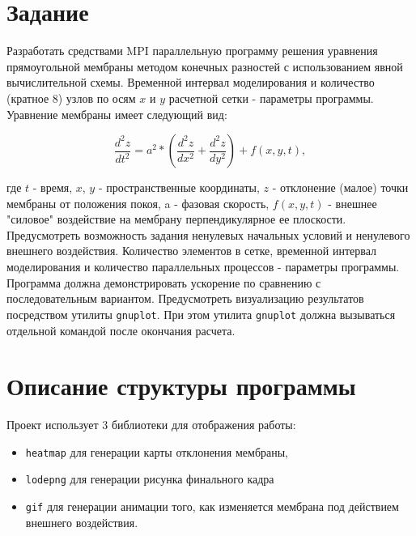 \section*{Задание}

Разработать средствами MPI параллельную программу решения уравнения
прямоугольной мембраны методом конечных разностей с использованием явной
вычислительной схемы. Временной интервал моделирования и количество (кратное 8)
узлов по осям $x$ и $y$ расчетной сетки - параметры программы. Уравнение мембраны
имеет следующий вид:

\begin{equation}
    \frac{d^2z}{dt^2} = a^2*(\frac{d^2z}{dx^2}+\frac{d^2z}{dy^2})+f(x,y,t),
    \label{eq:membrane}
\end{equation}


где $t$ - время, $x$, $y$ - пространственные координаты, $z$ - отклонение (малое)
точки мембраны от положения покоя, a - фазовая скорость, $f(x,y,t)$ - внешнее
"силовое" воздействие на мембрану перпендикулярное ее плоскости. Предусмотреть
возможность задания ненулевых начальных условий и ненулевого внешнего
воздействия. Количество элементов в сетке, временной интервал моделирования и
количество параллельных процессов - параметры программы. Программа должна
демонстрировать ускорение по сравнению с последовательным вариантом.
Предусмотреть визуализацию результатов посредством утилиты \texttt{gnuplot}. При этом
утилита \texttt{gnuplot} должна вызываться отдельной командой после окончания расчета.

\newpage

\section*{Описание структуры программы}


Проект использует 3 библиотеки для отображения работы: 

\begin{itemize}
    \item \texttt{heatmap} для генерации карты отклонения мембраны,
    \item \texttt{lodepng} для генерации рисунка финального кадра
    \item \texttt{gif} для генерации анимации того, как изменяется мембрана под действием внешнего воздействия.
\end{itemize}

